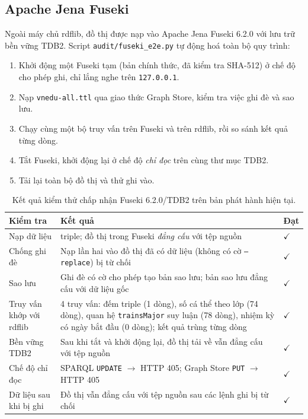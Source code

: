 \documentclass[12pt,a4paper]{article}
\begin{document}
\subsection{Apache Jena Fuseki}
Ngoài máy chủ rdflib, đồ thị được nạp vào Apache Jena Fuseki 6.2.0 với lưu trữ bền vững TDB2. Script
\texttt{audit/fuseki\_e2e.py} tự động hoá toàn bộ quy trình:
\begin{enumerate}
  \item Khởi động một Fuseki tạm (bản chính thức, đã kiểm tra SHA-512) ở chế độ cho phép ghi, chỉ lắng nghe trên
  \texttt{127.0.0.1}.
  \item Nạp \texttt{vnedu-all.ttl} qua giao thức Graph Store, kiểm tra việc ghi đè và sao lưu.
  \item Chạy cùng một bộ truy vấn trên Fuseki và trên rdflib, rồi so sánh kết quả từng dòng.
  \item Tắt Fuseki, khởi động lại ở chế độ \emph{chỉ đọc} trên cùng thư mục TDB2.
  \item Tải lại toàn bộ đồ thị và thử ghi vào.
\end{enumerate}

\begin{table}[htbp]
\centering\small
\caption{Kết quả kiểm thử chấp nhận Fuseki 6.2.0/TDB2 trên bản phát hành hiện tại.}\label{tab:fuseki}
\begin{tabularx}{\textwidth}{>{\raggedright\arraybackslash}p{4.4cm}X>{\centering\arraybackslash}p{1.2cm}}
\toprule
Kiểm tra & Kết quả & Đạt \\
\midrule
Nạp dữ liệu & \metricUnionTriples{} triple; đồ thị trong Fuseki \emph{đẳng cấu} với tệp nguồn & \(\checkmark\) \\
Chống ghi đè & Nạp lần hai vào đồ thị đã có dữ liệu (không có cờ \texttt{--replace}) bị từ chối & \(\checkmark\) \\
Sao lưu & Ghi đè có cờ cho phép tạo bản sao lưu; bản sao lưu đẳng cấu với dữ liệu gốc & \(\checkmark\) \\
Truy vấn khớp với rdflib & 4 truy vấn: đếm triple (1 dòng), số cá thể theo lớp (74 dòng), quan hệ
\texttt{trainsMajor} suy luận (78 dòng), nhiệm kỳ có ngày bắt đầu (0 dòng); kết quả trùng từng dòng & \(\checkmark\) \\
Bền vững TDB2 & Sau khi tắt và khởi động lại, đồ thị tải về vẫn đẳng cấu với tệp nguồn & \(\checkmark\) \\
Chế độ chỉ đọc & SPARQL \texttt{UPDATE} \(\to\) HTTP 405; Graph Store \texttt{PUT} \(\to\) HTTP 405 & \(\checkmark\) \\
Dữ liệu sau khi bị ghi & Đồ thị vẫn đẳng cấu với tệp nguồn sau các lệnh ghi bị từ chối & \(\checkmark\) \\
\bottomrule
\end{tabularx}
\end{table}
\end{document}
